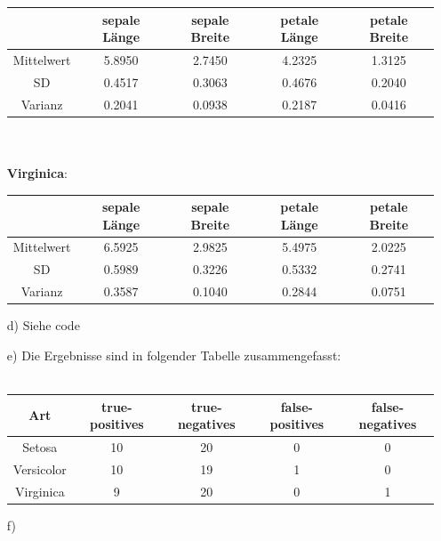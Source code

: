 \documentclass[a4paper]{scrartcl}
\begin{document}
\begin{itemize}
\begin{tabular}{c|c|c|c|c}
	&sepale Länge & sepale Breite & petale Länge & petale Breite\\
	\hline
	Mittelwert & 5.8950 &   2.7450  &  4.2325  &  1.3125 \\
	SD & 0.4517  &  0.3063  &  0.4676  &  0.2040\\
	Varianz & 0.2041  &  0.0938  &  0.2187  &  0.0416\\
\end{tabular}\\ \\
\textbf{Virginica}:\\
\begin{tabular}{c|c|c|c|c}
	&sepale Länge & sepale Breite & petale Länge & petale Breite\\
	\hline
	Mittelwert & 6.5925  &  2.9825  &  5.4975  &  2.0225\\
	SD & 0.5989 &   0.3226  &  0.5332  &  0.2741\\
	Varianz & 0.3587  &  0.1040  &  0.2844  &  0.0751\\
\end{tabular}
	\item[d)] Siehe code
	\item[e)] Die Ergebnisse sind in folgender Tabelle zusammengefasst:\\ \\ \begin{tabular}{c|c|c|c|c}
		Art & true-positives & true-negatives & false-positives & false-negatives\\
		\hline
		Setosa & 10 & 20 & 0 & 0\\
		Versicolor & 10 & 19 & 1 & 0\\
		Virginica & 9 & 20 & 0& 1\\
	\end{tabular}
	\item[f)]
	 

\end{itemize}
\end{document}
